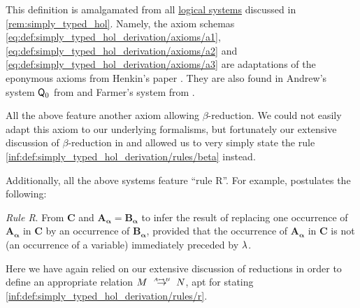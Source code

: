 \begin{comments}
  \item This definition is amalgamated from all \hyperref[con:logical_system]{logical systems} discussed in \cref{rem:simply_typed_hol}. Namely, the axiom schemas \eqref{eq:def:simply_typed_hol_derivation/axioms/a1}, \eqref{eq:def:simply_typed_hol_derivation/axioms/a2} and \eqref{eq:def:simply_typed_hol_derivation/axioms/a3} are adaptations of the eponymous axioms from Henkin's paper \cite[37]{Henkin1975Identity}. They are also found in Andrew's system \( \textsf{Q}_0 \) from \cite[\S 51]{Andrews2002Logic} and Farmer's system from \cite[278]{Farmer2008STTVirtues}.

  All the above feature another axiom allowing \( \beta \)-reduction. We could not easily adapt this axiom to our underlying formalisms, but fortunately our extensive discussion of \( \beta \)-reduction in  and  allowed us to very simply state the rule \ref{inf:def:simply_typed_hol_derivation/rules/beta} instead.

  Additionally, all the above systems feature \enquote{rule R}. For example,  postulates the following:
  \begin{displayquote}
    \textit{Rule R}. From \( \mathbf{C} \) and \( \mathbf{A_\alpha} = \mathbf{B_\alpha} \) to infer the result of replacing one occurrence of \( \mathbf{A_\alpha} \) in \( \mathbf{C} \) by an occurrence of \( \mathbf{B_\alpha} \), provided that the occurrence of \( \mathbf{A_\alpha} \) in \( \mathbf{C} \) is not (an occurrence of a variable) immediately preceded by \( {\mathrm \lambda} \).
  \end{displayquote}

  Here we have again relied on our extensive discussion of reductions in order to define an appropriate relation \( M \redrel{A \mapsto B} N \), apt for stating \ref{inf:def:simply_typed_hol_derivation/rules/r}.
\end{comments}

\begin{definition}\label{def:nth_order_logic}
\end{definition}

\begin{definition}\label{def:simply_typed_definitional_extension}\mimprovised
\end{definition}
